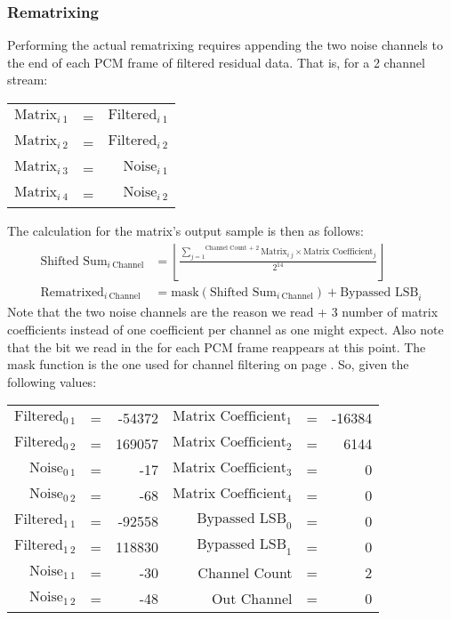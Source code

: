 \clearpage

\subsubsection{Rematrixing}

Performing the actual rematrixing requires appending the two
noise channels to the end of each PCM frame of filtered residual data.
That is, for a 2 channel stream:
\par
\noindent
\begin{tabular}{r c r}
$\text{Matrix}_{i~1}$ & = & $\text{Filtered}_{i~1}$ \\
$\text{Matrix}_{i~2}$ & = & $\text{Filtered}_{i~2}$ \\
$\text{Matrix}_{i~3}$ & = & $\text{Noise}_{i~1}$ \\
$\text{Matrix}_{i~4}$ & = & $\text{Noise}_{i~2}$
\end{tabular}
\par
\noindent
The calculation for the matrix's output sample is then as follows:
\begin{align*}
\text{Shifted Sum}_{i~\text{Channel}} &= \left\lfloor\frac{\overset{\text{Channel Count + 2}}{\underset{j = 1}{\sum}}{\text{Matrix}_{i~j} \times \text{Matrix Coefficient}_j}}{2 ^ {14}}\right\rfloor \\
\text{Rematrixed}_{i~\text{Channel}} &= \text{mask}(\text{Shifted Sum}_{i~\text{Channel}}) + \text{Bypassed LSB}_i
\end{align*}
Note that the two noise channels are the reason we read
 + 3 number of matrix coefficients
instead of one coefficient per channel as one might expect.
Also note that the  bit we read in the
 for each PCM frame reappears at this point.
The mask function is the one used for channel filtering on page
\pageref{mlp_mask}.
So, given the following values:
\par
\noindent
\begin{tabular}{r c r r c r}
$\text{Filtered}_{0~1}$ & = & -54372 &
$\text{Matrix Coefficient}_1$ & = & -16384 \\
$\text{Filtered}_{0~2}$ & = & 169057 &
$\text{Matrix Coefficient}_2$ & = & 6144 \\
$\text{Noise}_{0~1}$ & = & -17 &
$\text{Matrix Coefficient}_3$ & = & 0 \\
$\text{Noise}_{0~2}$ & = & -68 &
$\text{Matrix Coefficient}_4$ & = & 0 \\
$\text{Filtered}_{1~1}$ & = & -92558 &
$\text{Bypassed LSB}_0$ & = & 0 \\
$\text{Filtered}_{1~2}$ & = & 118830 &
$\text{Bypassed LSB}_1$ & = & 0 \\
$\text{Noise}_{1~1}$ & = & -30 &
Channel Count & = & 2 \\
$\text{Noise}_{1~2}$ & = & -48 &
Out Channel & = & 0
\end{tabular}
